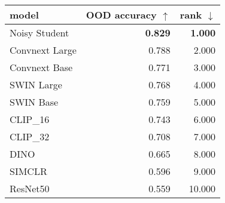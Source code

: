 \begin{tabular}{lrr}
\toprule
         model & OOD accuracy $\uparrow$ & rank $\downarrow$ \\
\midrule
 Noisy Student &          \textbf{0.829} &    \textbf{1.000} \\
Convnext Large &                   0.788 &             2.000 \\
 Convnext Base &                   0.771 &             3.000 \\
    SWIN Large &                   0.768 &             4.000 \\
     SWIN Base &                   0.759 &             5.000 \\
      CLIP\_16 &                   0.743 &             6.000 \\
      CLIP\_32 &                   0.708 &             7.000 \\
          DINO &                   0.665 &             8.000 \\
        SIMCLR &                   0.596 &             9.000 \\
      ResNet50 &                   0.559 &            10.000 \\
\bottomrule
\end{tabular}

